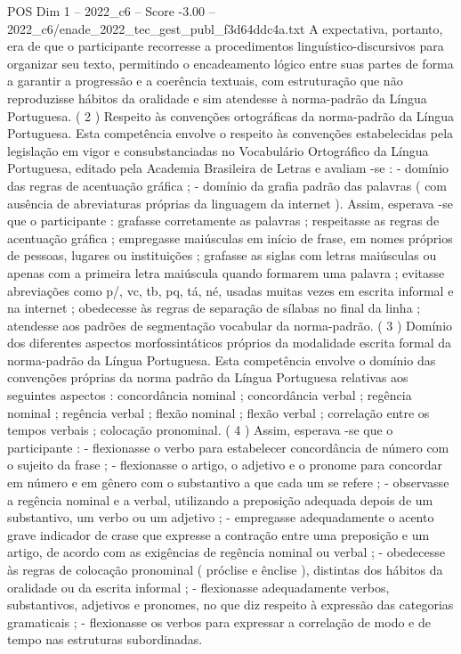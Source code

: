 \begin{textsample}{POS Dim 1 – 2022\_c6 – Score -3.00 – 2022\_c6/enade\_2022\_tec\_gest\_publ\_f3d64ddc4a.txt}
A expectativa, portanto, era de que o participante recorresse a procedimentos linguístico-discursivos para organizar seu texto, permitindo o encadeamento lógico entre suas partes de forma a garantir a progressão e a coerência textuais, com estruturação que não reproduzisse hábitos da oralidade e sim atendesse à norma-padrão da Língua Portuguesa. ( 2 ) Respeito às convenções ortográficas da norma-padrão da Língua Portuguesa.
Esta competência envolve o respeito às convenções estabelecidas pela legislação em vigor e consubstanciadas no Vocabulário Ortográfico da Língua Portuguesa, editado pela Academia Brasileira de Letras e avaliam -se : - domínio das regras de acentuação gráfica ; - domínio da grafia padrão das palavras ( com ausência de abreviaturas próprias da linguagem da internet ).
Assim, esperava -se que o participante : grafasse corretamente as palavras ; respeitasse as regras de acentuação gráfica ; empregasse maiúsculas em início de frase, em nomes próprios de pessoas, lugares ou instituições ; grafasse as siglas com letras maiúsculas ou apenas com a primeira letra maiúscula quando formarem uma palavra ; evitasse abreviações como p/, vc, tb, pq, tá, né, usadas muitas vezes em escrita informal e na internet ; obedecesse às regras de separação de sílabas no final da linha ; atendesse aos padrões de segmentação vocabular da norma-padrão. ( 3 ) Domínio dos diferentes aspectos morfossintáticos próprios da modalidade escrita formal da norma-padrão da Língua Portuguesa.
Esta competência envolve o domínio das convenções próprias da norma padrão da Língua Portuguesa relativas aos seguintes aspectos : concordância nominal ; concordância verbal ; regência nominal ; regência verbal ; flexão nominal ; flexão verbal ; correlação entre os tempos verbais ; colocação pronominal. ( 4 ) Assim, esperava -se que o participante : - flexionasse o verbo para estabelecer concordância de número com o sujeito da frase ; - flexionasse o artigo, o adjetivo e o pronome para concordar em número e em gênero com o substantivo a que cada um se refere ; - observasse a regência nominal e a verbal, utilizando a preposição adequada depois de um substantivo, um verbo ou um adjetivo ; - empregasse adequadamente o acento grave indicador de crase que expresse a contração entre uma preposição e um artigo, de acordo com as exigências de regência nominal ou verbal ; - obedecesse às regras de colocação pronominal ( próclise e ênclise ), distintas dos hábitos da oralidade ou da escrita informal ; - flexionasse adequadamente verbos, substantivos, adjetivos e pronomes, no que diz respeito à expressão das categorias gramaticais ; - flexionasse os verbos para expressar a correlação de modo e de tempo nas estruturas subordinadas.

\end{textsample}
